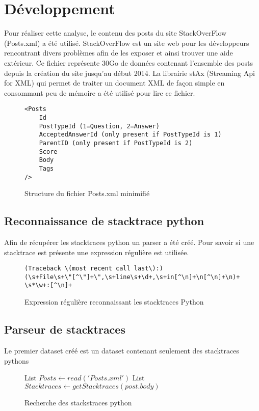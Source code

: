 \section{Développement}
Pour réaliser cette analyse, le contenu des posts du site StackOverFlow (Posts.xml) a été utilisé. StackOverFlow est un site web pour les développeurs rencontrant divers problèmes afin de les exposer et ainsi trouver une aide extérieur. Ce fichier représente 30Go de données contenant l'ensemble des posts depuis la création du site jusqu'au début 2014.
La librairie stAx (Streaming Api for XML) qui permet de traiter un document XML de façon simple en consommant peu de mémoire a été utilisé pour lire ce fichier.
\begin{figure}
\begin{lstlisting}
<Posts
	Id
	PostTypeId (1=Question, 2=Answer)
	AcceptedAnswerId (only present if PostTypeId is 1)
	ParentID (only present if PostTypeId is 2)
	Score
	Body
	Tags
/>
\end{lstlisting}
\caption{Structure du fichier Posts.xml minimifié}
\label{code:posts}
\end{figure}

\subsection{Reconnaissance de stacktrace python}
Afin de récupérer les stacktraces python un parser a été créé. Pour savoir si une stacktrace est présente une expression régulière est utilisée.
\begin{figure}
\begin{lstlisting}
(Traceback \(most recent call last\):)
(\s+File\s+\"[^\"]+\",\s+line\s+\d+,\s+in[^\n]+\n[^\n]+\n)+
\s*\w+:[^\n]+
\end{lstlisting}
\caption{Expression régulière reconnaissant les stacktraces Python}
\label{code:regex}
\end{figure}

\subsection{Parseur de stacktraces}
Le premier dataset créé est un dataset contenant seulement  des stacktraces pythons
\begin{figure}[!h]
\begin{center}
\begin{algorithmic}
	\State List $Posts \gets read('Posts.xml')$
		\State List $Stacktraces \gets getStacktraces(post.body)$
		\EndFor
	\EndFor
\EndFunction
\end{algorithmic}
\caption{Recherche des stackstraces python}
\label{Recherche des stackstraces python}
\end{center}
\end{figure}

